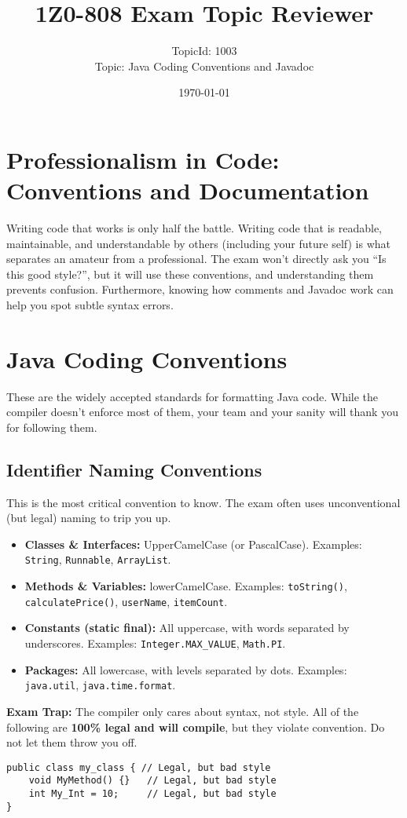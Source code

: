 \documentclass[12pt]{article}
\title{\textbf{1Z0-808 Exam Topic Reviewer}}
\author{TopicId: 1003 \\ Topic: Java Coding Conventions and Javadoc}
\date{\today}
\begin{document}
\maketitle
\newpage\begin{enumerate}[label=(\arabic*)]
\section*{Professionalism in Code: Conventions and Documentation}
Writing code that works is only half the battle. Writing code that is readable, maintainable, and understandable by others (including your future self) is what separates an amateur from a professional. The exam won't directly ask you ``Is this good style?'', but it will use these conventions, and understanding them prevents confusion. Furthermore, knowing how comments and Javadoc work can help you spot subtle syntax errors.

\section{Java Coding Conventions}
These are the widely accepted standards for formatting Java code. While the compiler doesn't enforce most of them, your team and your sanity will thank you for following them.

\subsection{Identifier Naming Conventions}
This is the most critical convention to know. The exam often uses unconventional (but legal) naming to trip you up.
\begin{itemize}
    \item \textbf{Classes & Interfaces:} UpperCamelCase (or PascalCase). Examples: \texttt{String}, \texttt{Runnable}, \texttt{ArrayList}.
    \item \textbf{Methods & Variables:} lowerCamelCase. Examples: \texttt{toString()}, \texttt{calculatePrice()}, \texttt{userName}, \texttt{itemCount}.
    \item \textbf{Constants (static final):} All uppercase, with words separated by underscores. Examples: \texttt{Integer.MAX_VALUE}, \texttt{Math.PI}.
    \item \textbf{Packages:} All lowercase, with levels separated by dots. Examples: \texttt{java.util}, \texttt{java.time.format}.
\end{itemize}

\textbf{Exam Trap:} The compiler only cares about syntax, not style. All of the following are \textbf{100\% legal and will compile}, but they violate convention. Do not let them throw you off.
\begin{verbatim}
public class my_class { // Legal, but bad style
    void MyMethod() {}   // Legal, but bad style
    int My_Int = 10;     // Legal, but bad style
}
\end{verbatim}


\end{enumerate}
\end{document}
